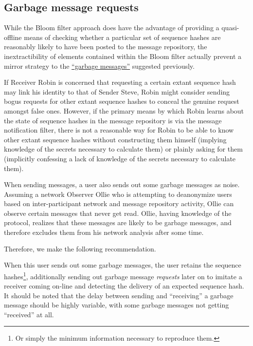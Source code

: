 \subsection{Garbage message requests}\label{garbage-message-requests}

While the Bloom filter approach does have the advantage of providing a quasi-offline means of checking whether a particular set of sequence hashes are reasonably likely to have been posted to the message repository, the inextractibility of elements contained within the Bloom filter actually prevent a mirror strategy to the \hyperref[garbage-messages]{``garbage messages''} suggested previously.

If Receiver Robin is concerned that requesting a certain extant sequence hash may link his identity to that of Sender Steve, Robin might consider sending bogus requests for other extant sequence hashes to conceal the genuine request amongst false ones. However, if the primary means by which Robin learns about the state of sequence hashes in the message repository is via the message notification filter, there is not a reasonable way for Robin to be able to know other extant sequence hashes without constructing them himself (implying knowledge of the secrets necessary to calculate them) or plainly asking for them (implicitly confessing a lack of knowledge of the secrets necessary to calculate them).

When sending messages, a user also sends out some garbage messages as noise. Assuming a network Observer Ollie who is attempting to deanonymize users based on inter-participant network and message repository activity, Ollie can observe certain messages that never get read. Ollie, having knowledge of the protocol, realizes that these messages are likely to be garbage messages, and therefore excludes them from his network analysis after some time.

Therefore, we make the following recommendation.

When this user sends out some garbage messages, the user retains the sequence hashes\footnote{Or simply the minimum information necessary to reproduce them.}, additionally sending out garbage message \emph{requests} later on to imitate a receiver coming on-line and detecting the delivery of an expected sequence hash. It should be noted that the delay between sending and ``receiving'' a garbage message should be highly variable, with some garbage messages not getting ``received'' at all.
